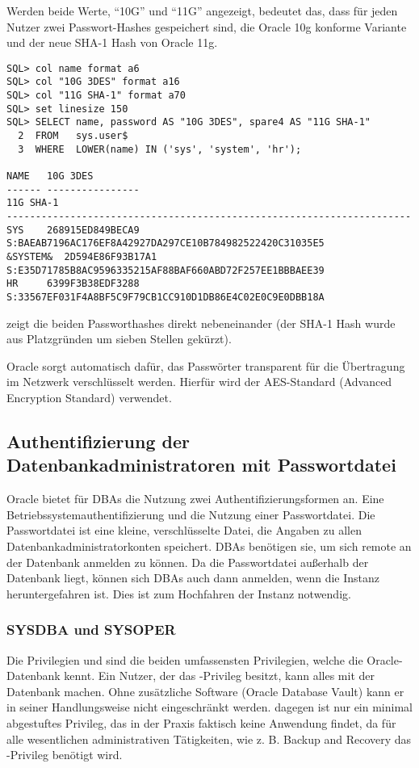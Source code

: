         Werden beide Werte, \enquote{10G} und \enquote{11G} angezeigt, bedeutet das, dass f\"ur jeden Nutzer zwei Passwort-Hashes gespeichert sind, die Oracle 10g konforme Variante und der neue SHA-1 Hash von Oracle 11g.
        \begin{lstlisting}[caption={Einblicke in das Data Dictionary -
        Passwordhashes},label=admin208,language=oracle_sql,alsolanguage=sqlplus]
SQL> col name format a6
SQL> col "10G 3DES" format a16
SQL> col "11G SHA-1" format a70
SQL> set linesize 150
SQL> SELECT name, password AS "10G 3DES", spare4 AS "11G SHA-1"
  2  FROM   sys.user$
  3  WHERE  LOWER(name) IN ('sys', 'system', 'hr');

NAME   10G 3DES
------ ----------------
11G SHA-1
----------------------------------------------------------------------
SYS    268915ED849BECA9 S:BAEAB7196AC176EF8A42927DA297CE10B784982522420C31035E5
&SYSTEM&  2D594E86F93B17A1 S:E35D71785B8AC9596335215AF88BAF660ABD72F257EE1BBBAEE39
HR     6399F3B38EDF3288 S:33567EF031F4A8BF5C9F79CB1CC910D1DB86E4C02E0C9E0DBB18A
        \end{lstlisting}
         zeigt die beiden Passworthashes direkt nebeneinander (der SHA-1 Hash wurde aus Platzgr\"unden um sieben Stellen gek\"urzt).
        \begin{merke}
          Oracle sorgt automatisch daf\"ur, das Passw\"orter transparent f\"ur die \"Ubertragung im Netzwerk verschl\"usselt werden. Hierf\"ur wird der AES-Standard (Advanced Encryption Standard) verwendet.
        \end{merke}
      \subsection{Authentifizierung der Datenbankadministratoren mit Passwortdatei}
        Oracle bietet f\"ur DBAs die Nutzung zwei Authentifizierungsformen an.
        Eine Betriebssystemauthentifizierung und die Nutzung einer Passwortdatei.
        Die Passwortdatei ist eine kleine, verschl\"usselte Datei, die Angaben
        zu allen Datenbankadministratorkonten speichert. DBAs ben\"otigen sie, um
        sich remote an der Datenbank anmelden zu k\"onnen. Da die Passwortdatei
        au\ss{}erhalb der Datenbank liegt, k\"onnen sich DBAs auch dann
        anmelden, wenn die Instanz heruntergefahren ist. Dies ist zum
        Hochfahren der Instanz notwendig.
        \subsubsection{SYSDBA und SYSOPER}
          Die Privilegien  und  sind die
          beiden umfassensten Privilegien, welche die Oracle-Datenbank kennt.
          Ein Nutzer, der das -Privileg besitzt, kann alles mit
          der Datenbank machen. Ohne zus\"atzliche Software (Oracle Database
          Vault) kann er in seiner Handlungsweise nicht eingeschr\"ankt werden.
           dagegen ist nur ein minimal abgestuftes Privileg,
          das in der Praxis faktisch keine Anwendung findet, da f\"ur alle
          wesentlichen administrativen Tätigkeiten, wie z. B. Backup and
          Recovery das -Privileg ben\"otigt wird.

